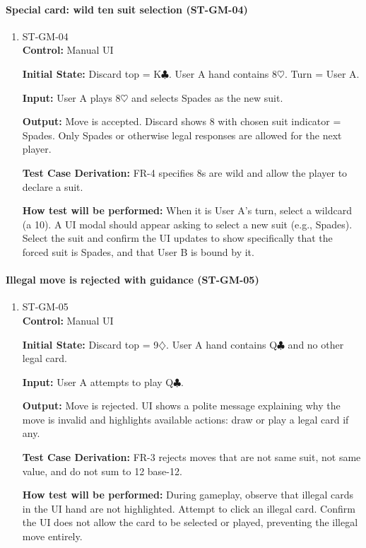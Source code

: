 \documentclass[12pt, titlepage]{article}
\begin{document}
\paragraph{Special card: wild ten suit selection (ST-GM-04)}
\begin{enumerate}
\item{ST-GM-04\\}
\textbf{Control:} Manual UI

\textbf{Initial State:} Discard top = K$\clubsuit$. User A hand contains 8$\heartsuit$. Turn = User A.

\textbf{Input:} User A plays 8$\heartsuit$ and selects Spades as the new suit.

\textbf{Output:} Move is accepted. Discard shows 8 with chosen suit indicator = Spades. Only Spades or otherwise legal responses are allowed for the next player.

\textbf{Test Case Derivation:} FR-4 specifies 8s are wild and allow the player to declare a suit.

\textbf{How test will be performed:} When it is User A's turn, select a wildcard (a 10). A UI modal should appear asking to select a new suit (e.g., Spades). Select the suit and confirm the UI updates to show specifically that the forced suit is Spades, and that User B is bound by it.
\end{enumerate}

\paragraph{Illegal move is rejected with guidance (ST-GM-05)}
\begin{enumerate}
\item{ST-GM-05\\}
\textbf{Control:} Manual UI

\textbf{Initial State:} Discard top = 9$\diamondsuit$. User A hand contains Q$\clubsuit$ and no other legal card.

\textbf{Input:} User A attempts to play Q$\clubsuit$.

\textbf{Output:} Move is rejected. UI shows a polite message explaining why the move is invalid and highlights available actions: draw or play a legal card if any.

\textbf{Test Case Derivation:} FR-3 rejects moves that are not same suit, not same value, and do not sum to 12 base-12.

\textbf{How test will be performed:} During gameplay, observe that illegal cards in the UI hand are not highlighted. Attempt to click an illegal card. Confirm the UI does not allow the card to be selected or played, preventing the illegal move entirely.
\end{enumerate}
\end{document}
